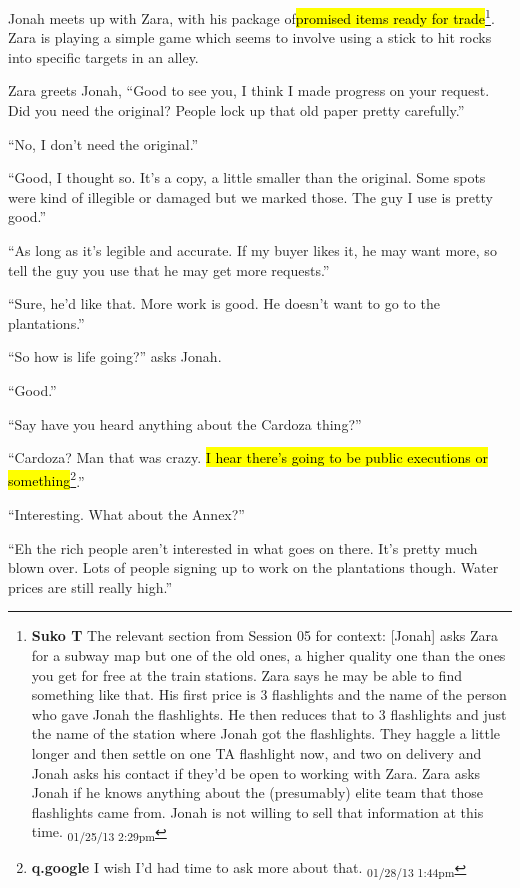 Jonah meets up with Zara, with his package of\hl{promised items ready for trade}\footnote{\textbf{Suko T }The relevant section from Session 05 for context: {[}Jonah{]} asks Zara for a subway map but one of the old ones, a higher quality one than the ones you get for free at the train stations.  Zara says he may be able to find something like that.  His first price is 3 flashlights and the name of the person who gave Jonah the flashlights.  He then reduces that to 3 flashlights and just the name of the station where Jonah got the flashlights.  They haggle a little longer and then settle on one TA flashlight now, and two on delivery and Jonah asks his contact if they'd be open to working with Zara.  Zara asks Jonah if he knows anything about the (presumably) elite team that those flashlights came from.  Jonah is not willing to sell that information at this time. \textsubscript{01/25/13 2:29pm}}.  Zara is playing a simple game which seems to involve using a stick to hit rocks into specific targets in an alley.



Zara greets Jonah, ``Good to see you, I think I made progress on your request.  Did you need the original?  People lock up that old paper pretty carefully.''

``No, I don't need the original.''

``Good, I thought so.  It's a copy, a little smaller than the original.  Some spots were kind of illegible or damaged but we marked those.  The guy I use is pretty good.''

``As long as it's legible and accurate.  If my buyer likes it, he may want more, so tell the guy you use that he may get more requests.''

``Sure, he'd like that.  More work is good.  He doesn't want to go to the plantations.''



``So how is life going?'' asks Jonah.

``Good.''

``Say have you heard anything about the Cardoza thing?''

``Cardoza?  Man that was crazy.  \hl{I hear there's going to be public executions or something}\footnote{\textbf{q.google }I wish I'd had time to ask more about that. \textsubscript{01/28/13 1:44pm}}.''

``Interesting.  What about the Annex?''

``Eh the rich people aren't interested in what goes on there.  It's pretty much blown over.  Lots of people signing up to work on the plantations though.  Water prices are still really high.''

